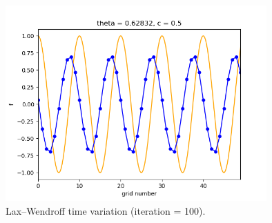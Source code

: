 \documentclass[a4paper,11pt]{article}
\begin{document}
\begin{figure}[H]
	\centering
	\includegraphics[width=10cm]{fig/lax_wen100}
	\caption{Lax–Wendroff time variation (iteration = 100).} 
\end{figure}


\end{document}
